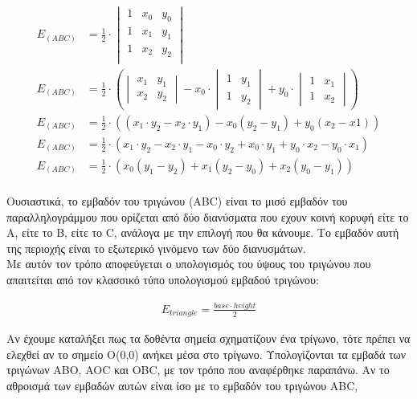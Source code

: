 \documentclass[12pt]{article}
\begin{document}
\begin{align*}
E_{(ABC)} &= \frac{1}{2} \cdot
\begin{vmatrix}
1 & x_0 & y_0 \\
1 & x_1 & y_1 \\
1 & x_2 & y_2 \\
\end{vmatrix} \\
E_{(ABC)} &= \frac{1}{2} \cdot (
\begin{vmatrix}
x_1 & y_1 \\
x_2 & y_2
\end{vmatrix} -
x_0 \cdot
\begin{vmatrix}
1 & y_1 \\
1 & y_2
\end{vmatrix} +
y_0 \cdot
\begin{vmatrix}
1 & x_1 \\
1 & x_2
\end{vmatrix}) \\
E_{(ABC)} &= \frac{1}{2} \cdot (
(x_1 \cdot y_2 - x_2 \cdot y_1) - x_0(y_2 - y_1) + y_0(x_2 - x1))\\
E_{(ABC)} &= \frac{1}{2} \cdot (
x_1 \cdot y_2 - x_2 \cdot y_1 - x_0 \cdot y_2 + x_0 \cdot y_1 + y_0 \cdot x_2 - y_0 \cdot x_1)\\
E_{(ABC)} &= \frac{1}{2} \cdot (
x_0(y_1 - y_2) + x_1 (y_2 - y_0) + x_2(y_0 - y_1))\\
\end{align*}

Ουσιαστικά, το εμβαδόν του τριγώνου (ABC) είναι το μισό εμβαδόν του παραλληλογράμμου που ορίζεται από δύο διανύσματα που εχουν κοινή κορυφή είτε το A, είτε το B, είτε το C, ανάλογα με την επιλογή που θα κάνουμε. Το εμβαδόν αυτή της περιοχής είναι το εξωτερικό γινόμενο των δύο διανυσμάτων.\\

Με αυτόν τον τρόπο αποφεύγεται ο υπολογισμός του ύψους του τριγώνου που απαιτείται από τον κλασσικό τύπο υπολογισμού εμβαδού τριγώνου:

\begin{align*}
E_{triangle} = \frac{base\cdot height}{2}
\end{align*}

Αν έχουμε καταλήξει πως τα δοθέντα σημεία σχηματίζουν ένα τρίγωνο, τότε πρέπει να ελεχθεί αν το σημείο Ο(0,0) ανήκει μέσα στο τρίγωνο. Υπολογίζονται τα εμβαδά των τριγώνων ABO, AOC και OBC, με τον τρόπο που αναφέρθηκε παραπάνω. Αν το αθροισμά των εμβαδών αυτών είναι ίσο με το εμβαδόν του τριγώνου ABC,
\end{document}
